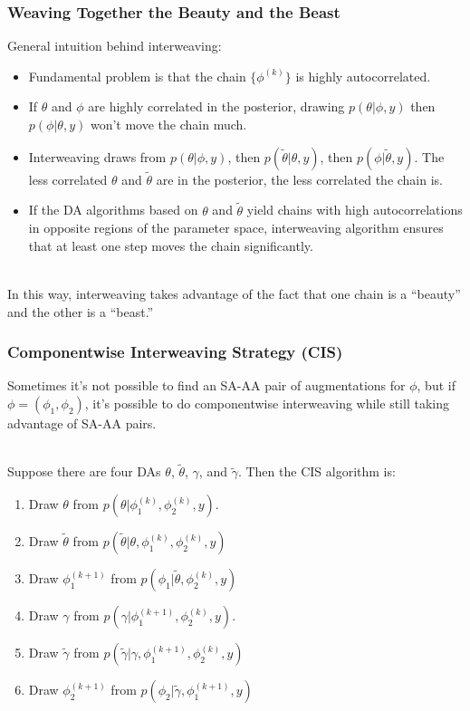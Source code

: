 \documentclass[xcolor=dvipsnames]{beamer}\usepackage{graphicx, color}
\begin{document}
\begin{frame}
  \frametitle{Weaving Together the Beauty and the Beast}
  General intuition behind interweaving:
  \begin{itemize}
   \item Fundamental problem is that the chain $\{\phi^{(k)}\}$ is highly autocorrelated.
   \item If $\theta$ and $\phi$ are highly correlated in the posterior, drawing $p(\theta|\phi,y)$ then $p(\phi|\theta,y)$ won't move the chain much.\pause
   \item Interweaving draws from $p(\theta|\phi,y)$, then $p(\tilde{\theta}|\theta,y)$, then $p(\phi|\tilde{\theta},y)$. The less correlated $\theta$ and $\tilde{\theta}$ are in the posterior, the less correlated the chain is.
   \item If the DA algorithms based on $\theta$ and $\tilde{\theta}$ yield chains with high autocorrelations in opposite regions of the parameter space, interweaving algorithm ensures that at least one step moves the chain significantly.\\~\\
  \end{itemize}
  \pause
  
  In this way, interweaving takes advantage of the fact that one chain is a ``beauty'' and the other is a ``beast.''
\end{frame}

\begin{frame}
  \frametitle{Componentwise Interweaving Strategy (CIS)}
Sometimes it's not possible to find an SA-AA pair of augmentations for $\phi$, but if $\phi=(\phi_1, \phi_2)$, it's possible to do componentwise interweaving while still taking advantage of SA-AA pairs.\\~\\\pause

Suppose there are four DAs $\theta$, $\tilde{\theta}$, $\gamma$, and $\tilde{\gamma}$. Then the CIS algorithm is:
  \begin{enumerate}
    \item Draw $\theta$ from $p(\theta|\phi^{(k)}_1, \phi^{(k)}_2, y)$.
    \item Draw $\tilde{\theta}$ from $p(\tilde{\theta}|\theta,\phi^{(k)}_1, \phi^{(k)}_2, y)$
    \item Draw $\phi_1^{(k+1)}$ from $p(\phi_1|\tilde{\theta},\phi_2^{(k)},y)$
    \item Draw $\gamma$ from $p(\gamma|\phi^{(k+1)}_1, \phi^{(k)}_2, y)$.
    \item Draw $\tilde{\gamma}$ from $p(\tilde{\gamma}|\gamma,\phi^{(k+1)}_1, \phi^{(k)}_2, y)$
    \item Draw $\phi_2^{(k+1)}$ from $p(\phi_2|\tilde{\gamma},\phi_1^{(k+1)},y)$\\~\\
  \end{enumerate}
  
\end{frame}
\end{document}
